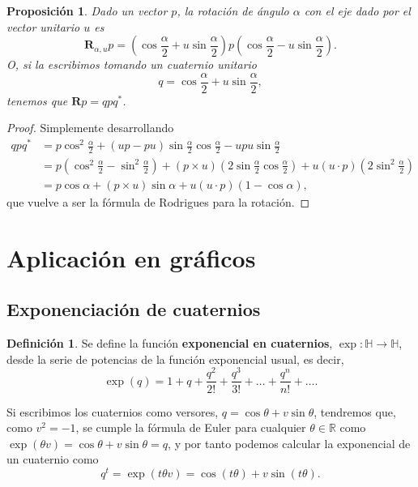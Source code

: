 \documentclass{article}
\theoremstyle{plain}
\newtheorem{proposition}{Proposición}
\theoremstyle{definition}
\newtheorem{definition}{Definición}
\theoremstyle{remark}
\begin{document}
\begin{proposition}
Dado un vector $p$, la rotación de ángulo $\alpha$ con el eje dado por
el vector unitario $u$ es
\[ \mathbf{R}_{\alpha,u}p =
  \left(\cos \frac{\alpha}{2} + u \sin \frac{\alpha}{2}\right)
  p
  \left(\cos \frac{\alpha}{2} - u \sin \frac{\alpha}{2}\right).\]
O, si la escribimos tomando un cuaternio unitario
\[
  q = \cos \frac{\alpha}{2} + u \sin \frac{\alpha}{2},
\]
tenemos que $\mathbf{R}p = qpq^\ast $.
\end{proposition}
\begin{proof}
  Simplemente desarrollando
  \[\begin{aligned}
      qpq^\ast &=
      p \cos^2\frac{\alpha}{2} + (up-pu)\sin\frac{\alpha}{2}\cos\frac{\alpha}{2} - upu\sin\frac{\alpha}{2}
      \\&=
      p \left(\cos^2\frac{\alpha}{2} - \sin^2\frac{\alpha}{2} \right) +
      (p \times u)\left(2\sin\frac{\alpha}{2}\cos\frac{\alpha}{2}\right) +
      u(u\cdot p)\left(2\sin^2\frac{\alpha}{2}\right)
      \\&=
      p \cos\alpha +
      (p \times u)\sin\alpha +
      u(u\cdot p)\left(1 - \cos \alpha\right),
    \end{aligned}\]
  que vuelve a ser la fórmula de Rodrigues para la rotación.
\end{proof}

\section{Aplicación en gráficos}

\subsection{Exponenciación de cuaternios}
\begin{definition}
  Se define la función \textbf{exponencial en cuaternios},
  $\exp \colon \mathbb{H} \to \mathbb{H}$, desde la serie de potencias
  de la función exponencial usual, es decir,
  \[\exp(q) =  1 + q + \frac{q^2}{2!} + \frac{q^3}{3!} + \dots + \frac{q^n}{n!} + \dots .
  \]
\end{definition}

Si escribimos los cuaternios como versores,
$q = \cos \theta + v \sin \theta$, tendremos que, como $v^2 = -1$, se
cumple la fórmula de Euler para cualquier $\theta \in \mathbb{R}$ como
$\exp(\theta v) = \cos \theta + v \sin \theta = q$, y por tanto
podemos calcular la exponencial de un cuaternio como
\[q^t = \exp(t \theta v) = \cos (t \theta) + v \sin (t \theta).\]
\end{document}

